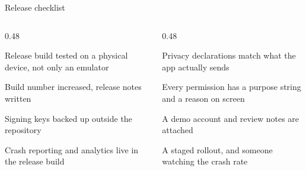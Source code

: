 \documentclass[10pt,aspectratio=169,t]{beamer}
\begin{document}
\begin{frame}[eyebrow=Checklist]{Release checklist}
  \vskip 2mm
  \begin{columns}[T]
    \begin{column}{0.48\textwidth}
      \begin{checklist}
        \item Release build tested on a physical device, not only an emulator
        \item Build number increased, release notes written
        \item Signing keys backed up outside the repository
        \item Crash reporting and analytics live in the release build
      \end{checklist}
    \end{column}
    \begin{column}{0.48\textwidth}
      \begin{checklist}
        \item Privacy declarations match what the app actually sends
        \item Every permission has a purpose string and a reason on screen
        \item A demo account and review notes are attached
        \item A staged rollout, and someone watching the crash rate
      \end{checklist}
    \end{column}
  \end{columns}
\end{frame}
\end{document}
